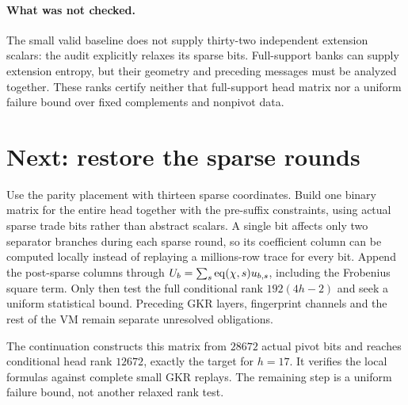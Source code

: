 \documentclass[11pt]{article}
\begin{document}
\paragraph{What was not checked.} The small valid baseline does not supply thirty-two independent extension scalars: the audit explicitly relaxes its sparse bits. Full-support banks can supply extension entropy, but their geometry and preceding messages must be analyzed together. These ranks certify neither that full-support head matrix nor a uniform failure bound over fixed complements and nonpivot data.

\section{Next: restore the sparse rounds}

Use the parity placement with thirteen sparse coordinates. Build one binary matrix for the entire head together with the pre-suffix constraints, using actual sparse trade bits rather than abstract scalars. A single bit affects only two separator branches during each sparse round, so its coefficient column can be computed locally instead of replaying a millions-row trace for every bit. Append the post-sparse columns through $U_b=\sum_s\operatorname{eq}(\chi,s)u_{b,s}$, including the Frobenius square term. Only then test the full conditional rank $192(4h-2)$ and seek a uniform statistical bound. Preceding GKR layers, fingerprint channels and the rest of the VM remain separate unresolved obligations.

The continuation  constructs this matrix from $28672$ actual pivot bits and reaches conditional head rank $12672$, exactly the target for $h=17$. It verifies the local formulas against complete small GKR replays. The remaining step is a uniform failure bound, not another relaxed rank test.
\end{document}
